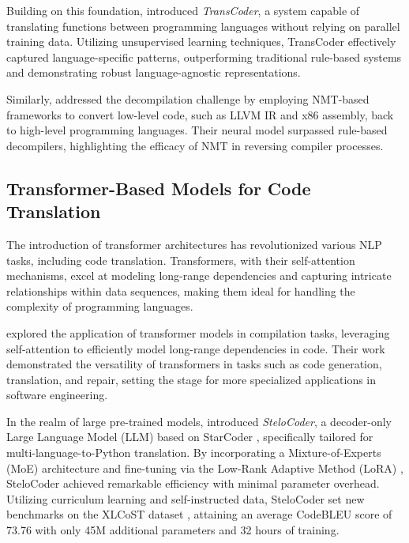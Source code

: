 \documentclass{dhbenelux}
\begin{document}
Building on this foundation, \cite{lachaux2020} introduced \textit{TransCoder}, a system capable of translating functions between programming languages without relying on parallel training data. Utilizing unsupervised learning techniques, TransCoder effectively captured language-specific patterns, outperforming traditional rule-based systems and demonstrating robust language-agnostic representations.

Similarly, \cite{katz2019} addressed the decompilation challenge by employing NMT-based frameworks to convert low-level code, such as LLVM IR and x86 assembly, back to high-level programming languages. Their neural model surpassed rule-based decompilers, highlighting the efficacy of NMT in reversing compiler processes.

\subsection{Transformer-Based Models for Code Translation}

The introduction of transformer architectures has revolutionized various NLP tasks, including code translation. Transformers, with their self-attention mechanisms, excel at modeling long-range dependencies and capturing intricate relationships within data sequences, making them ideal for handling the complexity of programming languages.

\cite{xiyu2024} explored the application of transformer models in compilation tasks, leveraging self-attention to efficiently model long-range dependencies in code. Their work demonstrated the versatility of transformers in tasks such as code generation, translation, and repair, setting the stage for more specialized applications in software engineering.

In the realm of large pre-trained models, \cite{pan2023} introduced \textit{SteloCoder}, a decoder-only Large Language Model (LLM) based on StarCoder \cite{li2023starcodersourceyou}, specifically tailored for multi-language-to-Python translation. By incorporating a Mixture-of-Experts (MoE) \cite{shazeer2017outrageouslylargeneuralnetworks} architecture and fine-tuning via the Low-Rank Adaptive Method (LoRA) \cite{hu2021loralowrankadaptationlarge}, SteloCoder achieved remarkable efficiency with minimal parameter overhead. Utilizing curriculum learning and self-instructed data, SteloCoder set new benchmarks on the XLCoST dataset \cite{xlcost2022}, attaining an average CodeBLEU score of 73.76 with only 45M additional parameters and 32 hours of training.
\end{document}
